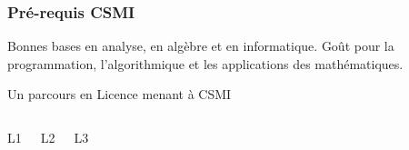 \begin{frame}
  \frametitle{Pré-requis CSMI}
  \begin{block}{}
    Bonnes bases en analyse, en algèbre et en informatique. 
    Goût pour la programmation, l'algorithmique et les applications des mathématiques.
  \end{block}
  \centerline{Un parcours en Licence menant à CSMI}
  \begin{columns}[t]
    \begin{block}{L1}
      
    \end{block}
    \begin{block}{L2}
      
    \end{block}
    \begin{block}{L3}
      
    \end{block}
  \end{columns}

\end{frame}
